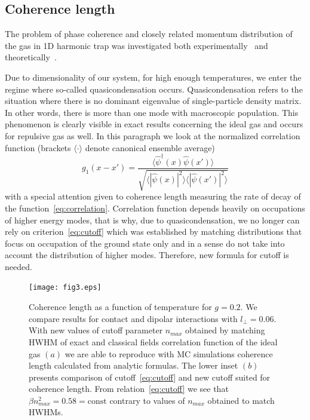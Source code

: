 \documentclass[aps,pra,reprint]{revtex4-2}
\begin{document}
\subsection{Coherence length}
The problem of phase coherence and closely related momentum distribution of the 
gas in 1D harmonic trap was investigated both experimentally~\cite{Richard2003} 
and theoretically~\cite{Kadio2005}.

Due to dimensionality of our system, for high enough temperatures, we enter the 
regime where so-called quasicondensation occurs. Quasicondensation refers to 
the situation where there is no dominant eigenvalue of single-particle density 
matrix. In other words, there is more than one mode with macroscopic 
population. This phenomenon is clearly visible in exact results concerning the 
ideal gas and occurs for repulsive gas as well. In this paragraph we look at 
the normalized correlation function (brackets $\langle \cdot \rangle$ denote 
canonical ensemble average)
\begin{equation}
\label{eq:correlation}
g_1(x-x') = \frac{\langle \hat{\psi}^{\dag}(x) \hat{\psi}(x') \rangle}
{\sqrt{\langle |\hat{\psi}(x)|^2 \rangle \langle |\hat{\psi}(x')|^2 \rangle}}
\end{equation}
with a special attention given to coherence length measuring the rate of decay 
of the function~\eqref{eq:correlation}. Correlation function depends heavily on 
occupations of higher energy modes, that is why, due to quasicondensation, we 
no longer can rely on criterion~\eqref{eq:cutoff} which was established by 
matching distributions that focus on occupation of the ground state only and in 
a sense do not take into account the distribution of higher modes. 
Therefore, new formula for cutoff is needed.
\begin{figure}[h]
\texttt{[image: fig3.eps]}
\caption{Coherence length as a function of temperature for $g=0.2$. We compare 
results for contact and dipolar interactions with $l_{\perp}=0.06$. With new 
values of cutoff parameter $n_{max}$ obtained by matching HWHM of exact and 
classical fields correlation function of the ideal gas $(a)$ we are able to 
reproduce with MC simulations coherence length calculated from analytic 
formulas. The lower inset $(b)$ presents comparison of cutoff~\eqref{eq:cutoff} 
and new cutoff suited for coherence length. From relation~\eqref{eq:cutoff} we 
see that $\beta n_{max}^2=0.58=\text{const}$ contrary to values of $n_{max}$ 
obtained to match HWHMs.}
\label{fig:coherence}
\end{figure}
\end{document}
